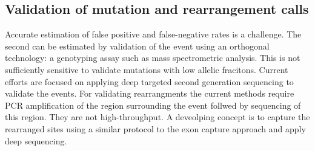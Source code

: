 	\subsection{Validation of mutation and rearrangement calls}
	Accurate estimation of false positive and false-negative rates is a challenge.
	The second can be estimated by validation of the event using an orthogonal technology: a genotyping assay such as mass spectrometric analysis.
	This is not sufficiently sensitive to validate mutations with low allelic fracitons.
	Current efforts are focused on applying deep targeted second generation sequencing to validate the events.
	For validating rearrangments the current methods require PCR amplification of the region surrounding the event follwed by sequencing of this region.
	They are not high-throughput.
	A deveolping concept is to capture the rearranged sites using a similar protocol to the exon capture approach and apply deep sequencing.

